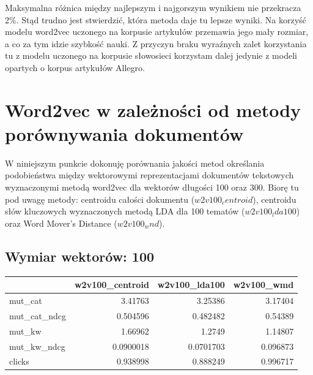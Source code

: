\documentclass[pl]{minipw} %
\begin{document}
Maksymalna różnica między najlepszym i najgorszym wynikiem nie przekracza 2\%. Stąd trudno jest stwierdzić, która metoda daje tu lepsze wyniki. Na korzyść modelu word2vec uczonego na korpusie artykułów przemawia jego mały rozmiar, a co za tym idzie szybkość nauki. Z przyczyn braku wyraźnych zalet korzystania tu z modelu uczonego na korpusie słowosieci korzystam dalej jedynie z modeli opartych o korpus artykułów Allegro.

\section{Word2vec w zależności od metody porównywania dokumentów}

W niniejszym punkcie dokonuję porównania jakości metod określania podobieństwa między wektorowymi reprezentacjami dokumentów tekstowych wyznaczonymi metodą word2vec dla wektorów długości 100 oraz 300. Biorę tu pod uwagę metody: centroidu całości dokumentu ($w2v100_centroid$), centroidu słów kluczowych wyznaczonych metodą LDA dla 100 tematów ($w2v100_lda100$) oraz Word Mover's Distance ($w2v100_wnd$).

\subsection{Wymiar wektorów: 100}

\begin{center}
	\begin{tabular}{lrrr}
		\hline
		&   w2v100\_centroid &   w2v100\_lda100 &   w2v100\_wmd \\
		\hline
		mut\_cat      &         3.41763   &       3.25386   &     3.17404  \\
		mut\_cat\_ndcg &         0.504596  &       0.482482  &     0.54389  \\
		mut\_kw       &         1.66962   &       1.2749    &     1.14807  \\
		mut\_kw\_ndcg  &         0.0900018 &       0.0701703 &     0.096873 \\
		clicks       &         0.938998  &       0.888249  &     0.996717 \\
		\hline
	\end{tabular}
\end{center}
\end{document}
